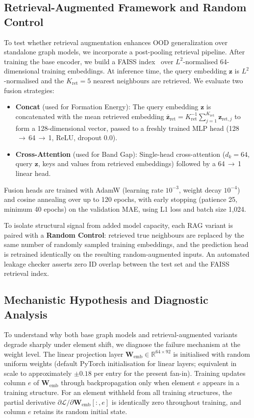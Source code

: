 \documentclass[final,5p,twocolumn,10pt]{elsarticle}
\begin{document}
\subsection{Retrieval-Augmented Framework and Random Control}
\label{sec:rag}

To test whether retrieval augmentation enhances OOD generalization over
standalone graph models, we incorporate a post-pooling retrieval pipeline.
After training the base encoder, we build a FAISS index~\cite{johnson2019billion}
over $L^2$-normalised 64-dimensional training embeddings. At inference time,
the query embedding $\bm{z}$ is $L^2$-normalised and the $K_{\text{ret}}=5$
nearest neighbours are retrieved. We evaluate two fusion strategies:

\begin{itemize}
\item \textbf{Concat} (used for Formation Energy): The query embedding
$\bm{z}$ is concatenated with the mean retrieved embedding
$\bar{\bm{z}}_{\text{ret}} = K_{\text{ret}}^{-1}\sum_{j=1}^{K_{\text{ret}}} \bm{z}_{\text{ret},j}$
to form a 128-dimensional vector, passed to a freshly trained MLP head
(128$\,{\to}\,$64$\,{\to}\,$1, ReLU, dropout 0.0).
\item \textbf{Cross-Attention} (used for Band Gap): Single-head cross-attention
($d_k = 64$, query $\bm{z}$, keys and values from retrieved embeddings)
followed by a 64$\,{\to}\,$1 linear head.
\end{itemize}

Fusion heads are trained with AdamW (learning rate $10^{-3}$,
weight decay $10^{-4}$) and cosine annealing over up to 120 epochs,
with early stopping (patience 25, minimum 40 epochs) on the validation
MAE, using L1 loss and batch size 1{,}024.

To isolate structural signal from added model capacity, each RAG variant
is paired with a \textbf{Random Control}: retrieved true neighbours are
replaced by the same number of randomly sampled training embeddings, and
the prediction head is retrained identically on the resulting
random-augmented inputs. An automated leakage checker asserts zero ID
overlap between the test set and the FAISS retrieval index.

\subsection{Mechanistic Hypothesis and Diagnostic Analysis}
\label{sec:mechanism}

To understand why both base graph models and retrieval-augmented variants
degrade sharply under element shift, we diagnose the failure mechanism at the
weight level. The linear projection layer $\bm{W}_{\text{emb}} \in \mathbb{R}^{64 \times 92}$
is initialised with random uniform weights (default PyTorch initialisation
for linear layers; equivalent in scale to approximately $\pm 0.18$ per
entry for the present fan-in). Training updates column $e$ of
$\bm{W}_{\text{emb}}$ through backpropagation only when element $e$ appears
in a training structure. For an element withheld from all training structures,
the partial derivative $\partial \mathcal{L} / \partial \bm{W}_{\text{emb}}[:,e]$
is identically zero throughout training, and column $e$ retains its random
initial state.
\end{document}
